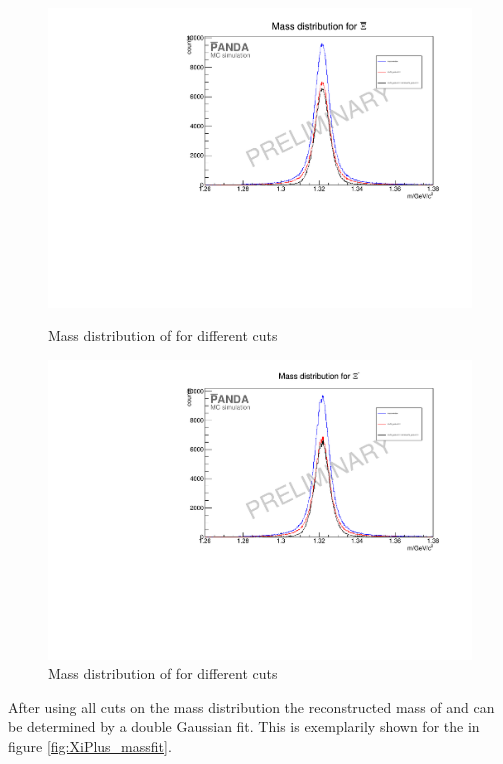 		\begin{figure}
			\centering
				\includegraphics[width=1.1\textwidth]{./plots/Xi/XiPlus_m_diffcuts.pdf}
			\caption{Mass distribution of \anticascade for different cuts}
			\label{fig:XiPlus_massdiffcuts}
			
				\includegraphics[width=1.1\textwidth]{./plots/Xi/XiMinus_m_diffcuts.pdf}
			\caption{Mass distribution of \cascade for different cuts}
			\label{fig:XiMinus_massdiffcuts}
		\end{figure}
		
		After using all cuts on the mass distribution the reconstructed mass of \cascade and \anticascade can be determined by a double Gaussian fit.
		This is exemplarily shown for the \cascade in figure \ref{fig:XiPlus_massfit}.
		
